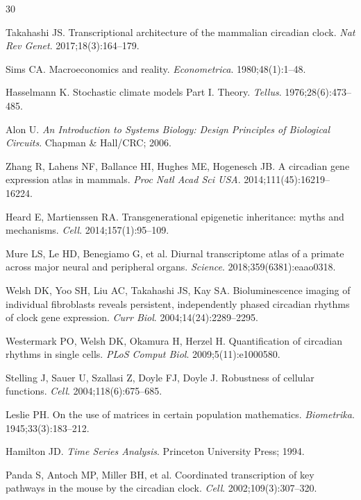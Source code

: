 \documentclass[11pt,letterpaper]{article}
\begin{document}

\begin{thebibliography}{30}

Takahashi JS.
Transcriptional architecture of the mammalian circadian clock.
\textit{Nat Rev Genet}. 2017;18(3):164--179.

Sims CA.
Macroeconomics and reality.
\textit{Econometrica}. 1980;48(1):1--48.

Hasselmann K.
Stochastic climate models Part I. Theory.
\textit{Tellus}. 1976;28(6):473--485.

Alon U.
\textit{An Introduction to Systems Biology: Design Principles of Biological Circuits}.
Chapman \& Hall/CRC; 2006.

Zhang R, Lahens NF, Ballance HI, Hughes ME, Hogenesch JB.
A circadian gene expression atlas in mammals.
\textit{Proc Natl Acad Sci USA}. 2014;111(45):16219--16224.

Heard E, Martienssen RA.
Transgenerational epigenetic inheritance: myths and mechanisms.
\textit{Cell}. 2014;157(1):95--109.

Mure LS, Le HD, Benegiamo G, et al.
Diurnal transcriptome atlas of a primate across major neural and peripheral organs.
\textit{Science}. 2018;359(6381):eaao0318.

Welsh DK, Yoo SH, Liu AC, Takahashi JS, Kay SA.
Bioluminescence imaging of individual fibroblasts reveals persistent, independently phased circadian rhythms of clock gene expression.
\textit{Curr Biol}. 2004;14(24):2289--2295.

Westermark PO, Welsh DK, Okamura H, Herzel H.
Quantification of circadian rhythms in single cells.
\textit{PLoS Comput Biol}. 2009;5(11):e1000580.

Stelling J, Sauer U, Szallasi Z, Doyle FJ, Doyle J.
Robustness of cellular functions.
\textit{Cell}. 2004;118(6):675--685.

Leslie PH.
On the use of matrices in certain population mathematics.
\textit{Biometrika}. 1945;33(3):183--212.

Hamilton JD.
\textit{Time Series Analysis}.
Princeton University Press; 1994.

Panda S, Antoch MP, Miller BH, et al.
Coordinated transcription of key pathways in the mouse by the circadian clock.
\textit{Cell}. 2002;109(3):307--320.


\end{thebibliography}
\end{document}
